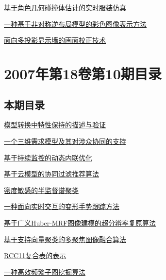\documentclass[a4paper]{article}
\begin{document}
\href{http://www.jos.org.cn/ch/reader/download_pdf.aspx?file_no=20071124&year_id=2007&quarter_id=11&falg=1}{基于角色几何碰撞体估计的实时服装仿真}

\href{http://www.jos.org.cn/ch/reader/download_pdf.aspx?file_no=20071125&year_id=2007&quarter_id=11&falg=1}{一种基于非对称逆布局模型的彩色图像表示方法}

\href{http://www.jos.org.cn/ch/reader/download_pdf.aspx?file_no=20071127&year_id=2007&quarter_id=11&falg=1}{面向多投影显示墙的画面校正技术}


\section{\textbf{2007年第18卷第10期目录}}
\subsection{本期目录}
\href{http://www.jos.org.cn/ch/reader/download_pdf.aspx?file_no=20071001&year_id=2007&quarter_id=10&falg=1}{模型转换中特性保持的描述与验证}

\href{http://www.jos.org.cn/ch/reader/download_pdf.aspx?file_no=20071002&year_id=2007&quarter_id=10&falg=1}{一个三维需求模型及其对涉众协同的支持}

\href{http://www.jos.org.cn/ch/reader/download_pdf.aspx?file_no=20071003&year_id=2007&quarter_id=10&falg=1}{基于持续监控的动态内联优化}

\href{http://www.jos.org.cn/ch/reader/download_pdf.aspx?file_no=20071004&year_id=2007&quarter_id=10&falg=1}{基于云模型的协同过滤推荐算法}

\href{http://www.jos.org.cn/ch/reader/download_pdf.aspx?file_no=20071005&year_id=2007&quarter_id=10&falg=1}{密度敏感的半监督谱聚类}

\href{http://www.jos.org.cn/ch/reader/download_pdf.aspx?file_no=20071006&year_id=2007&quarter_id=10&falg=1}{一种面向实时交互的变形手势跟踪方法}

\href{http://www.jos.org.cn/ch/reader/download_pdf.aspx?file_no=20071007&year_id=2007&quarter_id=10&falg=1}{基于广义Huber-MRF图像建模的超分辨率复原算法}

\href{http://www.jos.org.cn/ch/reader/download_pdf.aspx?file_no=20071008&year_id=2007&quarter_id=10&falg=1}{基于支持向量聚类的多聚焦图像融合算法}

\href{http://www.jos.org.cn/ch/reader/download_pdf.aspx?file_no=20071009&year_id=2007&quarter_id=10&falg=1}{RCC11复合表的表示}

\href{http://www.jos.org.cn/ch/reader/download_pdf.aspx?file_no=20071010&year_id=2007&quarter_id=10&falg=1}{一种高效频繁子图挖掘算法}
\end{document}
